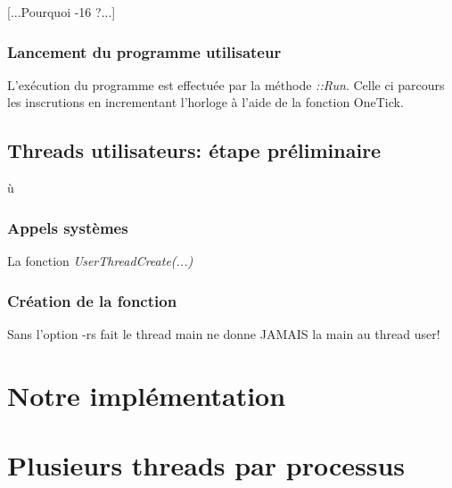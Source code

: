 \documentclass[a4paper,10pt]{article}
\begin{document}
[...Pourquoi -16 ?...]

\subsubsection{Lancement du programme utilisateur}

L'exécution du programme est effectuée par la méthode \textit{::Run}. Celle ci
parcours les inscrutions en incrementant l'horloge à l'aide de la fonction
OneTick.

\subsection{Threads utilisateurs: étape préliminaire}

ù\subsubsection{Appels systèmes}

  La fonction \textit{UserThreadCreate(...)}

\subsubsection{Création de la fonction}

Sans l'option -rs fait le thread  main ne donne JAMAIS la main au thread user!

\section{Notre implémentation}



\section{Plusieurs threads par processus}
\end{document}
